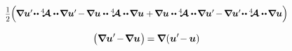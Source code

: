 \begin{equation*}
\smalldisplaystyleonehalf
\hspace{-0.1ex} \scalebox{.95}{$
   \Bigl( \hspace{-0.1ex}
      \boldnabla \bm{u}'
      \hspace{-0.4ex} \dotdotp \hspace{-0.1ex}
      \stiffnesstensor
      \dotdotp \hspace{-0.25ex}
      \boldnabla \bm{u}' \hspace{-0.25ex}
      - \hspace{-0.2ex} \boldnabla \bm{u}
      \dotdotp
      \stiffnesstensor
      \dotdotp \hspace{-0.25ex}
      \boldnabla \bm{u}
      + \hspace{-0.2ex}
      \boldnabla \bm{u}
      \dotdotp \hspace{-0.1ex}
      \stiffnesstensor
      \dotdotp \hspace{-0.25ex}
      \boldnabla \bm{u}' \hspace{-0.25ex}
      - \hspace{-0.2ex}
      \boldnabla \bm{u}' \hspace{-0.4ex}
      \dotdotp \hspace{-0.1ex}
      \stiffnesstensor
      \dotdotp \hspace{-0.25ex}
      \boldnabla \bm{u}
    \Bigr)
$}
\end{equation*}

\begin{equation*}
\bigl(
   \boldnabla \bm{u}'
   \hspace{-0.3ex} - \hspace{-0.32ex}
   \boldnabla \bm{u}
\hspace{.1ex} \bigr) \hspace{-0.2ex}
= \hspace{-0.1ex}
\boldnabla \hspace{.1ex} (
   \bm{u}' \hspace{-0.4ex} - \hspace{-0.1ex} \bm{u}
)
\end{equation*}

\noindent
{}

